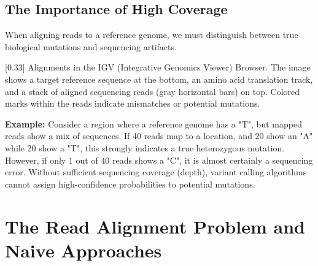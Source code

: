 \subsection{The Importance of High Coverage}

When aligning reads to a reference genome, we must distinguish between true biological mutations and sequencing artifacts.



[0.33]
Alignments in the IGV (Integrative Genomics Viewer) Browser. The image shows a target reference sequence at the bottom, an amino acid translation track, and a stack of aligned sequencing reads (gray horizontal bars) on top. Colored marks within the reads indicate mismatches or potential mutations.


\textbf{Example:}
Consider a region where a reference genome has a "T", but mapped reads show a mix of sequences. If 40 reads map to a location, and 20 show an "A" while 20 show a "T", this strongly indicates a true heterozygous mutation. However, if only 1 out of 40 reads shows a "C", it is almost certainly a sequencing error. Without sufficient sequencing coverage (depth), variant calling algorithms cannot assign high-confidence probabilities to potential mutations.

\section{The Read Alignment Problem and Naive Approaches}


